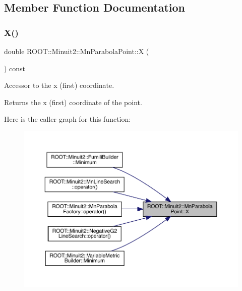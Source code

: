 \subsection{Member Function Documentation}
\mbox{\label{classROOT_1_1Minuit2_1_1MnParabolaPoint_afdb080f9186b5fa6966a42394f2a0678}} 
\subsubsection{\texorpdfstring{X()}{X()}\hspace{0.1cm}{\footnotesize\ttfamily [1/3]}}
{\footnotesize\ttfamily double R\+O\+O\+T\+::\+Minuit2\+::\+Mn\+Parabola\+Point\+::X (\begin{DoxyParamCaption}{ }\end{DoxyParamCaption}) const\hspace{0.3cm}{\ttfamily [inline]}}

Accessor to the x (first) coordinate.

\begin{DoxyReturn}{Returns}
the x (first) coordinate of the point. 
\end{DoxyReturn}
Here is the caller graph for this function\+:
\nopagebreak
\begin{figure}[H]
\begin{center}
\leavevmode
\includegraphics[width=350pt]{de/de5/classROOT_1_1Minuit2_1_1MnParabolaPoint_afdb080f9186b5fa6966a42394f2a0678_icgraph}
\end{center}
\end{figure}
\mbox{\label{classROOT_1_1Minuit2_1_1MnParabolaPoint_afdb080f9186b5fa6966a42394f2a0678}} 
